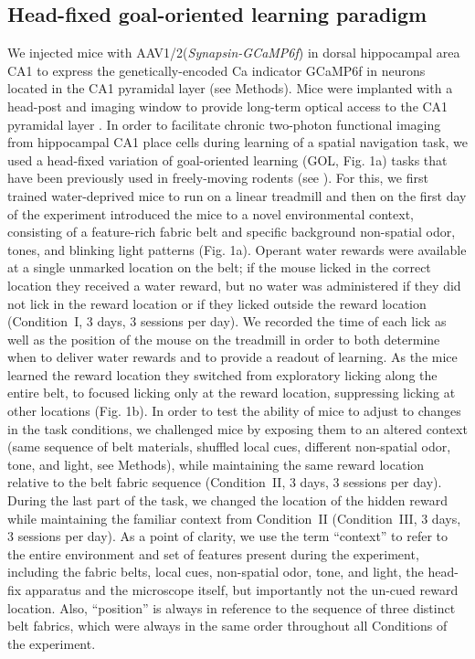 \subsection{Head-fixed goal-oriented learning paradigm}
We injected mice with AAV1/2(\emph{Synapsin-GCaMP6f}) in dorsal hippocampal area CA1 to express the genetically-encoded Ca indicator GCaMP6f \citep{Chen2013} in neurons located in the CA1 pyramidal layer (see Methods).  Mice were implanted with a head-post and imaging window to provide long-term optical access to the CA1 pyramidal layer \citep{Danielson2016b}\citep{Kaifosh2013}\citep{Lovett-Barron2014}.  In order to facilitate chronic two-photon functional imaging from hippocampal CA1 place cells \citep{Danielson2016b}\citep{Dombeck2010} during learning of a spatial navigation task, we used a head-fixed variation of goal-oriented learning \citep{Danielson2016b} (GOL, Fig. 1a) tasks that have been previously used in freely-moving rodents \citep{Dupret2010a} (see ).  For this, we first trained water-deprived mice to run on a linear treadmill \citep{Danielson2016a}\citep{Danielson2016b}\citep{Royer2012} and then on the first day of the experiment introduced the mice to a novel environmental context, consisting of a feature-rich fabric belt and specific background non-spatial odor, tones, and blinking light patterns (Fig. 1a). Operant water rewards were available at a single unmarked location on the belt; if the mouse licked in the correct location they received a water reward, but no water was administered if they did not lick in the reward location or if they licked outside the reward location (Condition~I, 3 days, 3 sessions per day).  We recorded the time of each lick as well as the position of the mouse on the treadmill in order to both determine when to deliver water rewards and to provide a readout of learning. As the mice learned the reward location they switched from exploratory licking along the entire belt, to focused licking only at the reward location, suppressing licking at other locations (Fig. 1b). In order to test the ability of mice to adjust to changes in the task conditions, we challenged mice by exposing them to an altered context (same sequence of belt materials, shuffled local cues, different non-spatial odor, tone, and light, see Methods), while maintaining the same reward location relative to the belt fabric sequence (Condition~II, 3 days, 3 sessions per day). During the last part of the task, we changed the location of the hidden reward while maintaining the familiar context from Condition~II (Condition~III, 3 days, 3 sessions per day). As a point of clarity, we use the term “context” to refer to the entire environment and set of features present during the experiment, including the fabric belts, local cues, non-spatial odor, tone, and light, the head-fix apparatus and the microscope itself, but importantly not the un-cued reward location. Also, “position” is always in reference to the sequence of three distinct belt fabrics, which were always in the same order throughout all Conditions of the experiment.

